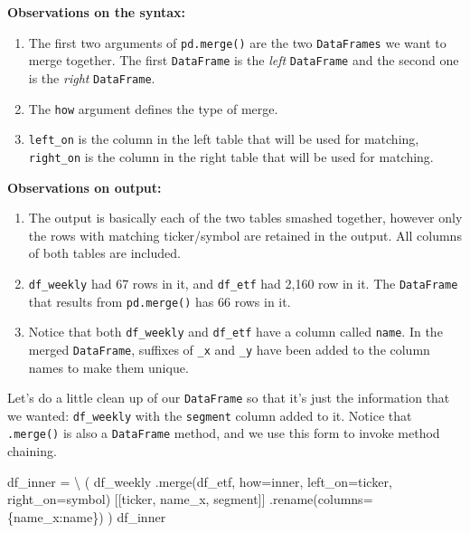 \documentclass[
  letterpaper,
  DIV=11,
  numbers=noendperiod]{scrreprt}
\newenvironment{Shaded}{\begin{snugshade}}{\end{snugshade}}
\newcommand{\NormalTok}[1]{\textcolor[rgb]{0.00,0.23,0.31}{#1}}
\newcommand{\OperatorTok}[1]{\textcolor[rgb]{0.37,0.37,0.37}{#1}}
\newcommand{\StringTok}[1]{\textcolor[rgb]{0.13,0.47,0.30}{#1}}
\begin{document}
\textbf{Observations on the syntax:}

\begin{enumerate}
\def\labelenumi{\arabic{enumi}.}
\item
  The first two arguments of \texttt{pd.merge()} are the two
  \texttt{DataFrames} we want to merge together. The first
  \texttt{DataFrame} is the \emph{left} \texttt{DataFrame} and the
  second one is the \emph{right} \texttt{DataFrame}.
\item
  The \texttt{how} argument defines the type of merge.
\item
  \texttt{left\_on} is the column in the left table that will be used
  for matching, \texttt{right\_on} is the column in the right table that
  will be used for matching.
\end{enumerate}

\textbf{Observations on output:}

\begin{enumerate}
\def\labelenumi{\arabic{enumi}.}
\item
  The output is basically each of the two tables smashed together,
  however only the rows with matching ticker/symbol are retained in the
  output. All columns of both tables are included.
\item
  \texttt{df\_weekly} had 67 rows in it, and \texttt{df\_etf} had 2,160
  row in it. The \texttt{DataFrame} that results from
  \texttt{pd.merge()} has 66 rows in it.
\item
  Notice that both \texttt{df\_weekly} and \texttt{df\_etf} have a
  column called \texttt{name}. In the merged \texttt{DataFrame},
  suffixes of \texttt{\_x} and \texttt{\_y} have been added to the
  column names to make them unique.
\end{enumerate}

Let's do a little clean up of our \texttt{DataFrame} so that it's just
the information that we wanted: \texttt{df\_weekly} with the
\texttt{segment} column added to it. Notice that \texttt{.merge()} is
also a \texttt{DataFrame} method, and we use this form to invoke method
chaining.

\begin{Shaded}
\begin{Highlighting}[]
\NormalTok{df\_inner }\OperatorTok{=} \OperatorTok{\textbackslash{}}
\NormalTok{    (}
\NormalTok{    df\_weekly}
\NormalTok{        .merge(df\_etf, how}\OperatorTok{=}\StringTok{\textquotesingle{}inner\textquotesingle{}}\NormalTok{, left\_on}\OperatorTok{=}\StringTok{\textquotesingle{}ticker\textquotesingle{}}\NormalTok{, right\_on}\OperatorTok{=}\StringTok{\textquotesingle{}symbol\textquotesingle{}}\NormalTok{)}
\NormalTok{        [[}\StringTok{\textquotesingle{}ticker\textquotesingle{}}\NormalTok{, }\StringTok{\textquotesingle{}name\_x\textquotesingle{}}\NormalTok{, }\StringTok{\textquotesingle{}segment\textquotesingle{}}\NormalTok{]]}
\NormalTok{        .rename(columns}\OperatorTok{=}\NormalTok{\{}\StringTok{\textquotesingle{}name\_x\textquotesingle{}}\NormalTok{:}\StringTok{\textquotesingle{}name\textquotesingle{}}\NormalTok{\})}
\NormalTok{    )}
\NormalTok{df\_inner}
\end{Highlighting}
\end{Shaded}
\end{document}
